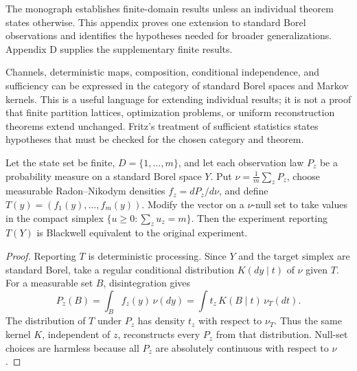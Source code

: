 
The monograph establishes finite-domain results unless an individual theorem states otherwise. This appendix proves one extension to standard Borel observations and identifies the hypotheses needed for broader generalizations. Appendix D supplies the supplementary finite results.


Channels, deterministic maps, composition, conditional independence, and sufficiency can be expressed in the category of standard Borel spaces and Markov kernels. This is a useful language for extending individual results; it is not a proof that finite partition lattices, optimization problems, or uniform reconstruction theorems extend unchanged. Fritz's treatment of sufficient statistics \autocite{fritz2020} states hypotheses that must be checked for the chosen category and theorem.


\begin{thmplain}

Let the state set be finite, \(D=\{1,\dots,m\}\), and let each observation law \(P_z\) be a probability measure on a standard Borel space \(Y\). Put \(\nu=\tfrac1m\sum_z P_z\), choose measurable Radon--Nikodym densities \(f_z=dP_z/d\nu\), and define \(T(y)=(f_1(y),\dots,f_m(y))\). Modify the vector on a \(\nu\)-null set to take values in the compact simplex \(\{u\ge 0:\sum_z u_z=m\}\). Then the experiment reporting \(T(Y)\) is Blackwell equivalent to the original experiment.
\end{thmplain}

\begin{proof}

Reporting \(T\) is deterministic processing. Since \(Y\) and the target simplex are standard Borel, take a regular conditional distribution \(K(dy\mid t)\) of \(\nu\) given \(T\). For a measurable set \(B\), disintegration gives
\[
P_z(B)=\int_B f_z(y)\,\nu(dy)=\int t_z\,K(B\mid t)\,\nu_T(dt).
\]
The distribution of \(T\) under \(P_z\) has density \(t_z\) with respect to \(\nu_T\). Thus the same kernel \(K\), independent of \(z\), reconstructs every \(P_z\) from that distribution. Null-set choices are harmless because all \(P_z\) are absolutely continuous with respect to \(\nu\).
\end{proof}

